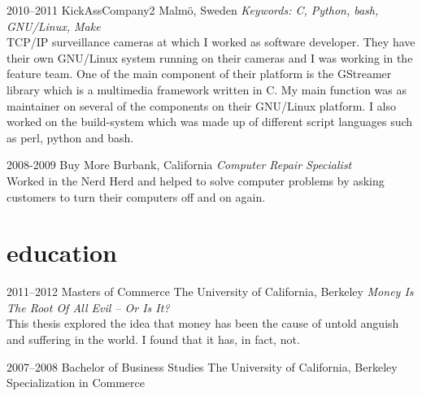 \documentclass[nocolors]{template/friggeri-cv-a4}
\begin{document}
\begin{entrylist}

\entry
{2010--2011}
{KickAssCompany2}
{Malmö, Sweden}
{\emph{Keywords: C, Python, bash, GNU/Linux, Make} \\
TCP/IP surveillance cameras at which I worked as software developer. They have their own GNU/Linux system running on their cameras and I was working in the feature team. One of the main component of their platform is the GStreamer library which is a multimedia framework written in C. My main function was as maintainer on several of the components on their GNU/Linux platform. I also worked on the build-system which was made up of different script languages such as perl, python and bash.}


\entry
{2008-2009}
{Buy More}
{Burbank, California}
{\emph{Computer Repair Specialist} \\
Worked in the Nerd Herd and helped to solve computer problems by asking customers to turn their computers off and on again.}


\end{entrylist}


\section{education}

\begin{entrylist}


\entry
{2011--2012}
{Masters {\normalfont of Commerce}}
{The University of California, Berkeley}
{\emph{Money Is The Root Of All Evil -- Or Is It?} \\ This thesis explored the idea that money has been the cause of untold anguish and suffering in the world. I found that it has, in fact, not.}


\entry
{2007--2008}
{Bachelor {\normalfont of Business Studies}}
{The University of California, Berkeley}
{Specialization in Commerce}


\end{entrylist}
\end{document}
